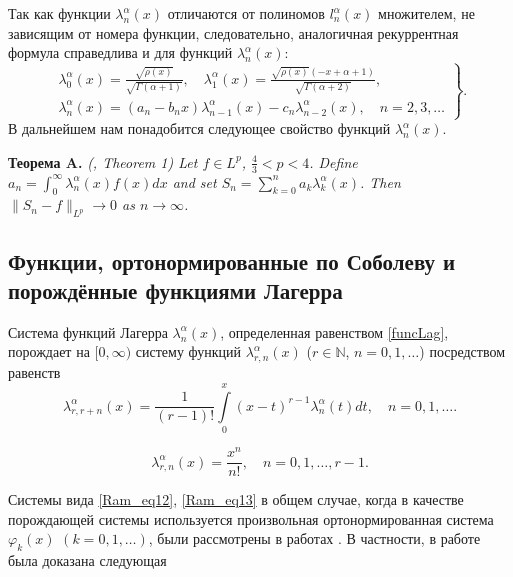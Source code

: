 \documentclass[a4paper,12pt]{article}
\begin{document}
Так как функции $\lambda_n^\alpha(x)$ отличаются от полиномов $l_n^\alpha(x)$ множителем, не зависящим от номера функции, следовательно, аналогичная рекуррентная формула справедлива и для функций $\lambda_n^\alpha(x)$:
\begin{equation*}
\left.\begin{gathered}
\lambda_{0}^{\alpha}(x)=\frac{\sqrt{\rho(x)}}{\sqrt{\Gamma(\alpha+1)}}, \quad \lambda_1^{\alpha}(x)=\frac{\sqrt{\rho(x)}(-x+\alpha+1)}{\sqrt{\Gamma(\alpha+2)}},\\
\lambda_n^{\alpha}(x)=(a_n-b_n x)\lambda_{n-1}^{\alpha}(x)-c_n \lambda_{n-2}^{\alpha}(x), \quad n=2, 3, \ldots
\end{gathered}\right\}.
\end{equation*}
В дальнейшем нам понадобится следующее свойство функций $\lambda_{n}^{\alpha}(x)$.

\textbf{Теорема A.}
\textit{(\cite{Ramlib1}, Theorem 1)
Let $f\in L^p$, $\frac{4}{3}<p<4$. Define $a_n=\int_{0}^{\infty}\lambda^\alpha_n(x)f(x)dx$ and set $S_n=\sum_{k=0}^{n}a_k\lambda^\alpha_k(x)$. Then $\|S_n-f\|_{L^p}\rightarrow0$ as $n\rightarrow\infty$.
}

\subsection{Функции, ортонормированные по Соболеву и порождённые функциями Лагерра}\label{Ram_sec3}

Система функций Лагерра $\lambda_n^\alpha(x)$, определенная равенством \eqref{funcLag}, порождает на $[0, \infty)$ систему функций $\lambda_{r,n}^\alpha(x)$ ($r\in\mathbb{N}$, $n=0, 1, \ldots$) посредством равенств
\begin{equation}\label{Ram_eq12}
\lambda_{r,r+n}^{\alpha}(x) =\frac{1}{(r-1)!}\int\limits_{0}^x(x-t)^{r-1}\lambda_{n}^{\alpha}(t)dt, \quad n=0,1,\ldots.
\end{equation}

\begin{equation}\label{Ram_eq13}
\lambda_{r,n}^{\alpha}(x) =\frac{x^n}{n!}, \quad n=0,1,\ldots, r-1.
\end{equation}

Системы вида \eqref{Ram_eq12}, \eqref{Ram_eq13} в общем случае, когда в качестве порождающей системы используется произвольная ортонормированная система $\varphi_k(x)$ $(k=0,1,\ldots)$, были рассмотрены в работах \cite{Ramlib4,Ramlib41,Ramlib42,Ramlib43,Ramlib44}.
В частности, в работе \cite{Ramlib4} была доказана следующая
\end{document}

